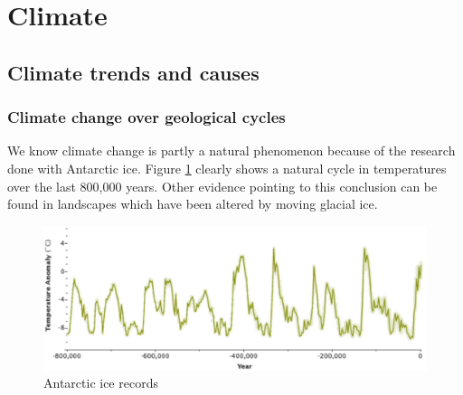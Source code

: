 \documentclass[../summary.tex]{subfiles}
\begin{document}
	
	\section{Climate}
		\subsection{Climate trends and causes}
			\subsubsection{Climate change over geological cycles}
				We know climate change is partly a natural phenomenon because of the research done with Antarctic ice. Figure \ref{fig:1-antarctic-ice-records} clearly shows a natural cycle in temperatures over the last 800,000 years. Other evidence pointing to this conclusion can be found in landscapes which have been altered by moving glacial ice.
				\begin{figure}[h]
					\centering
					\includegraphics[width=0.7\linewidth]{../images/1-antarctic-ice-records.png}
					\caption{Antarctic ice records}
					\label{fig:1-antarctic-ice-records}
				\end{figure}
			
\end{document}
